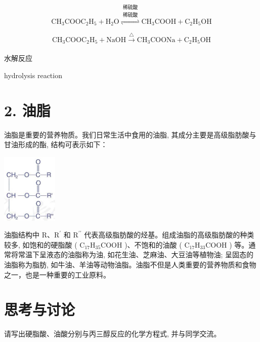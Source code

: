 \documentclass[10pt]{article}
\begin{document}
\[
{\mathrm{{CH}}}_{3}{\mathrm{{COOC}}}_{2}{\mathrm{H}}_{5} + {\mathrm{H}}_{2}\mathrm{O}\overset{\text{ 稀硫酸 }}{\overset{\text{ 稀硫酸 }}{ \rightleftharpoons }}{\mathrm{{CH}}}_{3}\mathrm{{COOH}} + {\mathrm{C}}_{2}{\mathrm{H}}_{5}\mathrm{{OH}}
\]

\[
{\mathrm{{CH}}}_{3}{\mathrm{{COOC}}}_{2}{\mathrm{H}}_{5} + \mathrm{{NaOH}}\xrightarrow[]{\bigtriangleup }{\mathrm{{CH}}}_{3}\mathrm{{COONa}} + {\mathrm{C}}_{2}{\mathrm{H}}_{5}\mathrm{{OH}}
\]

\begin{mdframed}

水解反应

hydrolysis reaction

\end{mdframed}

\section*{2. 油脂}

油脂是重要的营养物质。我们日常生活中食用的油脂, 其成分主要是高级脂肪酸与甘油形成的酯, 结构可表示如下：

\begin{center}
\includegraphics[max width=0.2\textwidth]{images/0190efc5-b58a-7c43-bfb0-e0a030df9cfd_83_159142.jpg}
\end{center}

油脂结构中 \(\mathrm{R}\text{、}{\mathrm{R}}^{\prime }\) 和 \({\mathrm{R}}^{\prime \prime }\) 代表高级脂肪酸的烃基。组成油脂的高级脂肪酸的种类较多, 如饱和的硬脂酸 ( \({\mathrm{C}}_{17}{\mathrm{H}}_{35}\mathrm{{COOH}}\) )、不饱和的油酸 ( \({\mathrm{C}}_{17}{\mathrm{H}}_{33}\mathrm{{COOH}}\) ) 等。通常将常温下呈液态的油脂称为油, 如花生油、芝麻油、大豆油等植物油; 呈固态的油脂称为脂肪, 如牛油、羊油等动物油脂。油脂不但是人类重要的营养物质和食物之一，也是一种重要的工业原料。

\section*{思考与讨论}

请写出硬脂酸、油酸分别与丙三醇反应的化学方程式, 并与同学交流。
\end{document}
